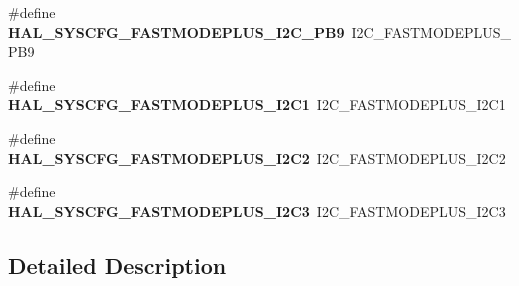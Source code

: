 \begin{DoxyCompactItemize}
\item 
\hypertarget{group___h_a_l___s_y_s_c_f_g___aliased___defines_ga8ace04770933b1fbf1b0e28abd6f3a25}{\#define {\bfseries H\-A\-L\-\_\-\-S\-Y\-S\-C\-F\-G\-\_\-\-F\-A\-S\-T\-M\-O\-D\-E\-P\-L\-U\-S\-\_\-\-I2\-C\-\_\-\-P\-B9}~I2\-C\-\_\-\-F\-A\-S\-T\-M\-O\-D\-E\-P\-L\-U\-S\-\_\-\-P\-B9}\label{group___h_a_l___s_y_s_c_f_g___aliased___defines_ga8ace04770933b1fbf1b0e28abd6f3a25}

\item 
\hypertarget{group___h_a_l___s_y_s_c_f_g___aliased___defines_gad982b1937d6178bc74b6f95e3d343ab1}{\#define {\bfseries H\-A\-L\-\_\-\-S\-Y\-S\-C\-F\-G\-\_\-\-F\-A\-S\-T\-M\-O\-D\-E\-P\-L\-U\-S\-\_\-\-I2\-C1}~I2\-C\-\_\-\-F\-A\-S\-T\-M\-O\-D\-E\-P\-L\-U\-S\-\_\-\-I2\-C1}\label{group___h_a_l___s_y_s_c_f_g___aliased___defines_gad982b1937d6178bc74b6f95e3d343ab1}

\item 
\hypertarget{group___h_a_l___s_y_s_c_f_g___aliased___defines_gaa415be62939648ababfdce87dea7c8d4}{\#define {\bfseries H\-A\-L\-\_\-\-S\-Y\-S\-C\-F\-G\-\_\-\-F\-A\-S\-T\-M\-O\-D\-E\-P\-L\-U\-S\-\_\-\-I2\-C2}~I2\-C\-\_\-\-F\-A\-S\-T\-M\-O\-D\-E\-P\-L\-U\-S\-\_\-\-I2\-C2}\label{group___h_a_l___s_y_s_c_f_g___aliased___defines_gaa415be62939648ababfdce87dea7c8d4}

\item 
\hypertarget{group___h_a_l___s_y_s_c_f_g___aliased___defines_ga3347764cd910d40c261ffcfa150b0912}{\#define {\bfseries H\-A\-L\-\_\-\-S\-Y\-S\-C\-F\-G\-\_\-\-F\-A\-S\-T\-M\-O\-D\-E\-P\-L\-U\-S\-\_\-\-I2\-C3}~I2\-C\-\_\-\-F\-A\-S\-T\-M\-O\-D\-E\-P\-L\-U\-S\-\_\-\-I2\-C3}\label{group___h_a_l___s_y_s_c_f_g___aliased___defines_ga3347764cd910d40c261ffcfa150b0912}

\end{DoxyCompactItemize}


\subsection{Detailed Description}

